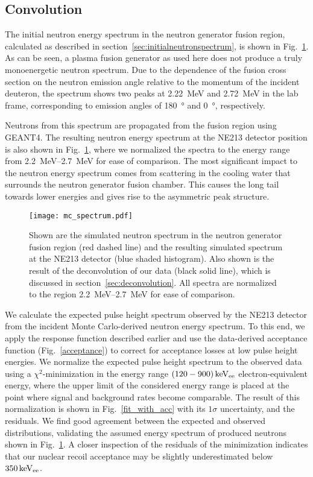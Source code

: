 \subsection{Convolution}\label{sec:convolution}

The initial neutron energy spectrum in the neutron generator fusion region, calculated as described in section~\ref{sec:initialneutronspectrum}, is shown in Fig.~\ref{incident_spectrum}. As can be seen, a plasma fusion generator as used here does not produce a truly monoenergetic neutron spectrum. Due to the dependence of the fusion cross section on the neutron emission angle relative to the momentum of the incident deuteron, the spectrum shows two peaks at \SI{2.22}{MeV} and \SI{2.72}{MeV} in the lab frame, corresponding to emission angles of \SI{180}{\degree} and \SI{0}{\degree}, respectively.

Neutrons from this spectrum are propagated from the fusion region using GEANT4. The resulting neutron energy spectrum at the NE213 detector position is also shown in Fig.~\ref{incident_spectrum}, where we normalized the spectra to the energy range from \SIrange{2.2}{2.7}{MeV} for ease of comparison. The most significant impact to the neutron energy spectrum comes from scattering in the cooling water that surrounds the neutron generator fusion chamber. This causes the long tail towards lower energies and gives rise to the asymmetric peak structure.

\begin{figure}[!htbp]
\begin{center}
\texttt{[image: mc\_spectrum.pdf]}
\caption{Shown are the simulated neutron spectrum in the neutron generator fusion region (red dashed line) and the resulting simulated spectrum at the NE213 detector (blue shaded histogram). Also shown is the result of the deconvolution of our data (black solid line), which is discussed in section~\ref{sec:deconvolution}. All spectra are normalized to the region \SIrange{2.2}{2.7}{MeV} for ease of comparison.}
\label{incident_spectrum}
\end{center}
\end{figure}

We calculate the expected pulse height spectrum observed by the NE213 detector from the incident Monte Carlo-derived neutron energy spectrum. To this end, we apply the response function described earlier and use the data-derived acceptance function (Fig.~\ref{acceptance}) to correct for acceptance losses at low pulse height energies. We normalize the expected pulse height spectrum to the observed data using a $\chi^2$-minimization in the energy range $(120-900)\, \mathrm{keV_{ee}}$ electron-equivalent energy, where the upper limit of the considered energy range is placed at the point where signal and background rates become comparable. The result of this normalization is shown in Fig.~\ref{fit_with_acc} with its $1\sigma$ uncertainty, and the residuals. We find good agreement between the expected and observed distributions, validating the assumed energy spectrum of produced neutrons shown in Fig.~\ref{incident_spectrum}. A closer inspection of the residuals of the minimization indicates that our nuclear recoil acceptance may be slightly underestimated below $350\, \mathrm{keV_{ee}}$.

